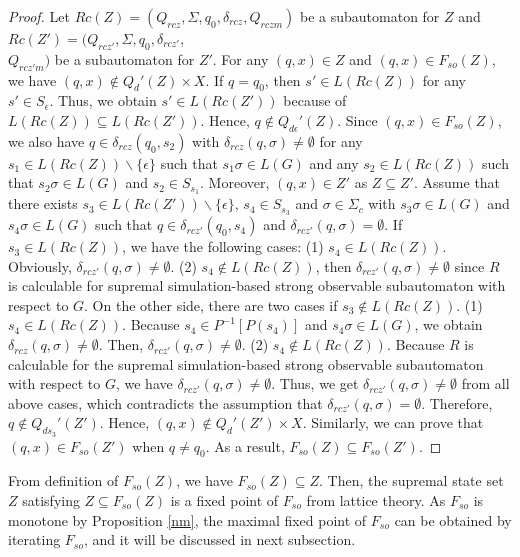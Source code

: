 \documentclass[12pt,draftcls,onecolumn]{IEEEtran}
\begin{document}
\begin{proof}
Let $Rc(Z)=(Q_{rcz},\Sigma,q_{0},\delta_{rcz},Q_{rczm})$ be a
subautomaton for $Z$ and
$Rc(Z')=(Q_{rcz'},\Sigma,q_{0},\delta_{rcz'}$,
\\
$Q_{rcz'm})$ be a subautomaton for $Z'$. For any $(q, x) \in Z$
and $(q, x) \in F_{so}(Z)$, we have $(q, x) \notin Q_d'(Z) \times
X$. If $q=q_0$, then $s' \in L(Rc(Z))$ for any $s' \in
S_{\epsilon}$. Thus, we obtain $s' \in L(Rc(Z'))$ because of
$L(Rc(Z))\subseteq L(Rc(Z'))$. Hence, $q \notin
Q_{d\epsilon}'(Z)$. Since $(q, x) \in F_{so}(Z)$, we also have $q
\in \delta_{rcz}(q_0, s_2)$ with $\delta_{rcz}(q, \sigma) \neq
\emptyset$ for any $s_1 \in L(Rc(Z)) \backslash \{\epsilon\}$ such
that $s_1\sigma \in L(G)$ and any $s_2 \in L(Rc(Z))$ such that
$s_2\sigma \in L(G)$ and $s_2 \in S_{s_1}$. Moreover, $(q ,x) \in
Z'$ as $Z\subseteq Z'$. Assume that there exists $s_3 \in
L(Rc(Z')) \backslash \{\epsilon \}$, $s_4 \in S_{s_3}$ and $\sigma
\in \Sigma_{c}$ with $s_3\sigma \in L(G)$ and $s_4\sigma \in L(G)$
such that $q \in \delta_{rcz'}(q_0, s_4)$ and $\delta_{rcz'}(q,
\sigma)=\emptyset$. If $s_3 \in L(Rc(Z))$, we have the following
cases: (1) $s_4 \in L(Rc(Z))$. Obviously, $\delta_{rcz'}(q,
\sigma) \neq \emptyset$. (2) $s_4 \notin L(Rc(Z))$, then
$\delta_{rcz'}(q, \sigma) \neq \emptyset$ since $R$ is calculable
for supremal simulation-based strong observable subautomaton with
respect to $G$. On the other side, there are two cases if $s_3
\notin L(Rc(Z))$. (1)$s_4 \in L(Rc(Z))$. Because $s_4 \in
P^{-1}[P(s_4)]$ and $s_4\sigma \in L(G)$, we obtain
$\delta_{rcz}(q, \sigma) \neq \emptyset$. Then, $\delta_{rcz'}(q,
\sigma) \neq \emptyset$. (2) $s_4 \notin L(Rc(Z))$. Because $R$ is
calculable for the supremal simulation-based strong observable
subautomaton with respect to $G$, we have $\delta_{rcz'}(q,
\sigma) \neq \emptyset$. Thus, we get $\delta_{rcz'}(q, \sigma)
\neq \emptyset$ from all above cases, which contradicts the
assumption that $\delta_{rcz'}(q, \sigma)=\emptyset$. Therefore,
$q \notin Q_{ds_3}'(Z')$. Hence, $(q, x) \notin Q_d'(Z') \times
X$. Similarly, we can prove that $(q, x) \in F_{so}(Z')$ when $q
\neq q_0$. As a result, $F_{so}(Z) \subseteq F_{so}(Z')$.
\end{proof}






From definition of $F_{so}(Z)$, we have $F_{so}(Z)\subseteq Z$.
Then, the supremal state set $Z$ satisfying $Z\subseteq F_{so}(Z)$
is a fixed point of $F_{so}$ from lattice theory. As $F_{so}$ is
monotone by Proposition \ref{nm}, the maximal fixed point of
$F_{so}$ can be obtained by iterating $F_{so}$, and it will be
discussed in next subsection.
\end{document}
